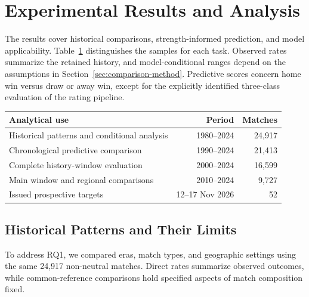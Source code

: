 \section{Experimental Results and Analysis}
\label{sec:results}

The results cover historical comparisons, strength-informed prediction, and model applicability. Table~\ref{tab:analysis-samples} distinguishes the samples for each task. Observed rates summarize the retained history, and model-conditional ranges depend on the assumptions in Section~\ref{sec:comparison-method}. Predictive scores concern home win versus draw or away win, except for the explicitly identified three-class evaluation of the rating pipeline.

\begin{table}[htbp]
\centering\small
{}
\label{tab:analysis-samples}
\begin{tabular}{@{}lrr@{}}
\toprule
Analytical use & Period & Matches \\
\midrule
Historical patterns and conditional analysis & 1980--2024 & 24,917 \\
Chronological predictive comparison & 1990--2024 & 21,413 \\
Complete history-window evaluation & 2000--2024 & 16,599 \\
Main window and regional comparisons & 2010--2024 & 9,727 \\
Issued prospective targets & 12--17 Nov 2026 & 52 \\
\bottomrule
\end{tabular}
\end{table}

\subsection{Historical Patterns and Their Limits}
\label{sec:historical-results}

To address RQ1, we compared eras, match types, and geographic settings using the same 24,917 non-neutral matches. Direct rates summarize observed outcomes, while common-reference comparisons hold specified aspects of match composition fixed.

